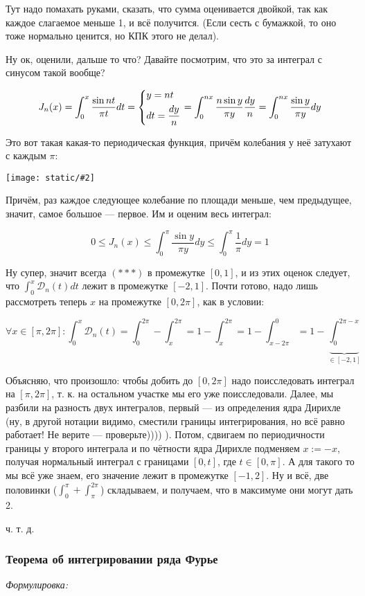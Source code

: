 \documentclass{article}
\def\images#1#2{\begin{center}\texttt{[image: static/\#2]}\end{center}}
\def\DD{\mathcal{D}}
\begin{document}
Тут надо помахать руками, сказать, что сумма оценивается двойкой, так как каждое слагаемое меньше 1, и всё получится. (Если сесть с бумажкой, то оно тоже нормально ценится, но КПК этого не делал).

Ну ок, оценили, дальше то что? Давайте посмотрим, что это за интеграл с синусом такой вообще?

\[J_n(x) = \int_{0}^{x} \frac{\sin nt}{\pi t} dt = \begin{dcases}
    y = nt \\
    dt = \frac{dy}{n}
\end{dcases} = \int_{0}^{nx} \frac{n \sin y}{\pi y} \frac{dy}{n} = \int_0^{nx} \frac{\sin y}{\pi y} dy\]

Это вот такая какая-то периодическая функция, причём колебания у неё затухают с каждым $\pi$:

\images{0.8}{lemm_sin.jpg}

Причём, раз каждое следующее колебание по площади меньше, чем предыдущее, значит, самое большое --- первое. Им и оценим весь интеграл:

\[0 \le J_n(x) \le \int_{0}^{\pi} \frac{\sin y}{\pi y} dy \le \int_{0}^{\pi} \frac{1}{\pi} dy = 1\]

Ну супер, значит всегда $(***)$ в промежутке $[0, 1]$, и из этих оценок следует, что $\int_0^x \DD_n(t)dt$ лежит в промежутке $[-2, 1]$. Почти готово, надо лишь рассмотреть теперь $x$ на промежутке $[0, 2\pi]$, как в условии:

\[\forall x \in [\pi, 2\pi] : \int_0^{x} \DD_n(t) = \int_0^{2\pi} - \int_x^{2\pi} = 1 -\int_x^{2\pi} = 1 - \int_{x  -2\pi}^{0} = 1 - \underbrace{\int_0^{2\pi - x}}_{\in [-2, 1]}\]

Объясняю, что произошло: чтобы добить до $[0, 2\pi]$ надо поисследовать интеграл на $[\pi, 2\pi]$, т. к. на остальном участке мы его уже поисследовали. Далее, мы разбили на разность двух интегралов, первый --- из определения ядра Дирихле (ну, в другой нотации видимо, сместили границы интегрирования, но всё равно работает! Не верите --- проверьте)))) ). Потом, сдвигаем по периодичности границы у второго интеграла и по чётности ядра Дирихле подменяем $x := -x$, получая нормальный интеграл с границами $[0, t]$, где $t \in [0, \pi]$. А для такого то мы всё уже знаем, его значение лежит в промежутке $[-1, 2]$. Ну и всё, две половинки ($\int_0^{\pi} + \int_\pi^{2\pi}$) складываем, и получаем, что в максимуме они могут дать 2.

ч. т. д.

\subsubsection{Теорема об интегрировании ряда Фурье}
\textit{Формулировка:}
\end{document}
